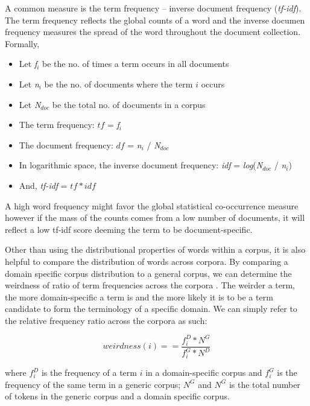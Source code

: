 A common measure is the term frequency – inverse document frequency (\emph{tf-idf}). The term frequency reflects the global counts of a word and the inverse documen frequency measures the spread of the word throughout the document collection. Formally,

\begin{itemize}[noitemsep]
\item[] Let \emph{f$_i$} be the no. of times a term occurs in all documents
\item[] Let \emph{n$_i$} be the no. of documents where the term $i$ occurs
\item[] Let \emph{N$_{doc}$} be the total no. of documents in a corpus
\item[] The term frequency: $tf$ = \emph{f$_i$}
\item[] The document frequency: $df$ = \emph{n$_i$} / \emph{N$_{doc}$}
\item[] In logarithmic space, the inverse document frequency: \emph{idf} = \emph{log}(\emph{N$_{doc}$} / \emph{n$_i$})
\item[] And, \emph{tf-idf} = $tf * idf$
\end{itemize}

A high word frequency might favor the global statistical co-occurrence measure however if the mass of the counts comes from a low number of documents, it will reflect a low tf-idf score deeming the term to be document-specific.

Other than using the distributional properties of words within a corpus, it is also helpful to compare the distribution of words across corpora. By comparing a domain specific corpus distribution to a general corpus, we can determine the weirdness of ratio of term frequencies across the corpora \citep{ahmad1999university}. The weirder a term, the more domain-specific a term is and the more likely it is to be a term candidate to form the terminology of a specific domain. We can simply refer to the relative frequency ratio across the corpora as such:

\begin{equation}
weirdness(i)==\frac { { f }_{ i }^{ D }*{ N }_{  }^{ G } }{ { f }_{ i }^{ G }*{ N }_{  }^{ D } } 
\end{equation}

where ${ f }_{ i }^{ D }$ is the frequency of a term $i$ in a domain-specific corpus and ${ f }_{ i }^{ G }$ is the frequency of the same term in a generic corpus;  ${N }_{  }^{ G }$ and ${N }_{  }^{ G }$ is the total number of tokens in the generic corpus and a domain specific corpus.

